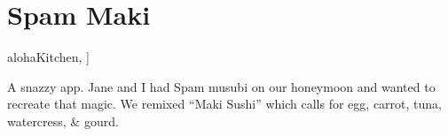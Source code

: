 \section{Spam Maki}

\begin{recipestats}[
        servings=4,
        preptime=60~\minute,
        bakingtime=30~\minute,
        inactivetime=30~\minute,
        source=Mike \& Jane,
        original=\citetitle{alohaKitchen}~\cite[p.~42]{alohaKitchen},
    ]
\end{recipestats}

\begin{recipeabstract}
    A snazzy app.
    Jane and I had Spam musubi on our honeymoon and wanted to recreate that magic.
    We remixed ``Maki Sushi'' \cite{alohaKitchen} which calls for egg, carrot, tuna, watercress, \& gourd.
\end{recipeabstract}

\begin{ingredientcolumns}
    \begin{ingredientblock}
        \\
        \\
        \\
        \\
        \\
    \end{ingredientblock}
    \begin{ingredientblock}
        \\
        \\
        \\
    \end{ingredientblock}
\end{ingredientcolumns}


